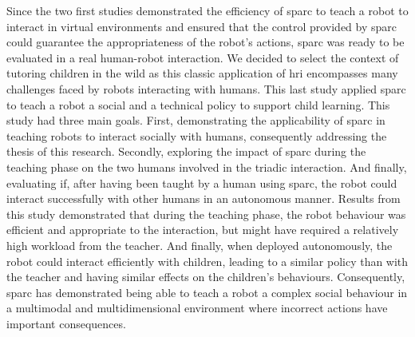 Since the two first studies demonstrated the efficiency of \gls{sparc} to teach a robot to interact in virtual environments and ensured that the control provided by \gls{sparc} could guarantee the appropriateness of the robot's actions, \gls{sparc} was ready to be evaluated in a real human-robot interaction. We decided to select the context of tutoring children in the wild as this classic application of \gls{hri} encompasses many challenges faced by robots interacting with humans. This last study applied \gls{sparc} to teach a robot a social and a technical policy to support child learning. This study had three main goals. First, demonstrating the applicability of \gls{sparc} in teaching robots to interact socially with humans, consequently addressing the thesis of this research. Secondly, exploring the impact of \gls{sparc} during the teaching phase on the two humans involved in the triadic interaction. And finally, evaluating if, after having been taught by a human using \gls{sparc}, the robot could interact successfully with other humans in an autonomous manner. Results from this study demonstrated that during the teaching phase, the robot behaviour was efficient and appropriate to the interaction, but might have required a relatively high workload from the teacher. And finally, when deployed autonomously, the robot could interact efficiently with children, leading to a similar policy than with the teacher and having similar effects on the children's behaviours. Consequently, \gls{sparc} has demonstrated being able to teach a robot a complex social behaviour in a multimodal and multidimensional environment where incorrect actions have important consequences.


